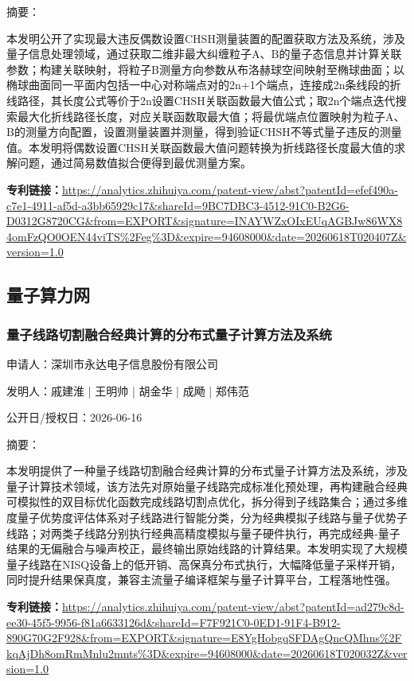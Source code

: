 \documentclass[12pt,a4paper]{ctexart}
\begin{document}
摘要：

本发明公开了实现最大违反偶数设置CHSH测量装置的配置获取方法及系统，涉及量子信息处理领域，通过获取二维非最大纠缠粒子A、B的量子态信息并计算关联参数；构建关联映射，将粒子B测量方向参数从布洛赫球空间映射至椭球曲面；以椭球曲面同一平面内包括一中心对称端点对的2n+1个端点，连接成2n条线段的折线路径，其长度公式等价于2n设置CHSH关联函数最大值公式；取2n个端点迭代搜索最大化折线路径长度，对应关联函数取最大值；将最优端点位置映射为粒子A、B的测量方向配置，设置测量装置并测量，得到验证CHSH不等式量子违反的测量值。本发明将偶数设置CHSH关联函数最大值问题转换为折线路径长度最大值的求解问题，通过简易数值拟合便得到最优测量方案。

\noindent\textbf{专利链接：}\url{https://analytics.zhihuiya.com/patent-view/abst?patentId=efef490a-c7e1-4911-af5d-a3bb65929c17&shareId=9BC7DBC3-4512-91C0-B2G6-D0312G8720CG&from=EXPORT&signature=INAYWZxOIxEUqAGBJw86WX84omFzQO0OEN44viTS%2Feg%3D&expire=94608000&date=20260618T020407Z&version=1.0}


\subsection{ 量子算力网 }

\subsubsection{ 量子线路切割融合经典计算的分布式量子计算方法及系统 }

申请人：深圳市永达电子信息股份有限公司

发明人：戚建淮 | 王明帅 | 胡金华 | 成飏 | 郑伟范

公开日/授权日：2026-06-16

摘要：

本发明提供了一种量子线路切割融合经典计算的分布式量子计算方法及系统，涉及量子计算技术领域，该方法先对原始量子线路完成标准化预处理，再构建融合经典可模拟性的双目标优化函数完成线路切割点优化，拆分得到子线路集合；通过多维度量子优势度评估体系对子线路进行智能分类，分为经典模拟子线路与量子优势子线路；对两类子线路分别执行经典高精度模拟与量子硬件执行，再完成经典‑量子结果的无偏融合与噪声校正，最终输出原始线路的计算结果。本发明实现了大规模量子线路在NISQ设备上的低开销、高保真分布式执行，大幅降低量子采样开销，同时提升结果保真度，兼容主流量子编译框架与量子计算平台，工程落地性强。

\noindent\textbf{专利链接：}\url{https://analytics.zhihuiya.com/patent-view/abst?patentId=ad279c8d-ee30-45f5-9956-f81a6633126d&shareId=F7F921C0-0ED1-91F4-B912-890G70G2F928&from=EXPORT&signature=E8YgHobgqSFDAgQncQMhns%2FkqAjDh8omRmMnlu2mnts%3D&expire=94608000&date=20260618T020032Z&version=1.0}
\end{document}
